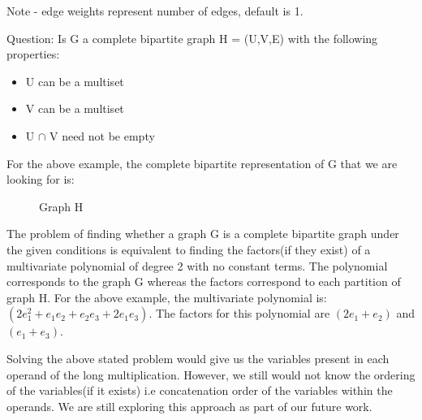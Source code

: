 Note - edge weights represent number of edges, default is 1.

\newpage

Question: Is G a complete bipartite graph H = (U,V,E) with the following properties:

\begin{itemize}
\item U can be a multiset
\item V can be a multiset
\item U $\cap$ V need not be empty
\end{itemize}

For the above example, the complete bipartite representation of G that we are looking for is: 
\begin{figure}[h]

\begin{center}

\caption{Graph H}

\end{center}
\end{figure}

The problem of finding whether a graph G is a complete bipartite graph under the given conditions is equivalent to finding the factors(if they exist) of a multivariate polynomial of degree 2 with no constant terms. The polynomial corresponds to the graph G whereas the factors correspond to each partition of graph H. For the above example, the multivariate polynomial is:
$(2 e_1^2 + e_1e_2 + e_2e_3 + 2 e_1e_3)$. The factors for this polynomial are $(2 e_1 + e_2)$ and $(e_1 + e_3)$.

Solving the above stated problem would give us the variables present in each operand of the long multiplication. However, we still would not know the ordering of the variables(if it exists) i.e concatenation order of the variables within the operands. We are still exploring this approach as part of our future work.
